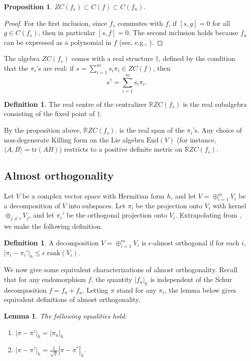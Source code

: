 \documentclass[10pt]{amsart}
\newtheorem{lem}[thm]{Lemma}
\newtheorem{prop}[thm]{Proposition}
\theoremstyle{definition}
\newtheorem{defn}[thm]{Definition}
\begin{document}
\begin{prop}\label{note}
   $ZC(f_s)\subset C(f) \subset C(f_n).$
\end{prop}
\begin{proof}
    For the first inclusion, since $f_s$ commutes with $f$, if $[s,g] = 0$ for all $g \in C(f_s)$, then in particular $[s,f] = 0$. The second inclusion holds because $f_n$ can be expressed as a polynomial in $f$ (see, e.g., \cite[section 4.2]{Hu}).
\end{proof}
The algebra $ZC(f_s)$ comes with a real structure $\dagger$, defined by the condition that the $\pi_i$'s are real: if $s=\sum_{i=1}^m s_i\pi_i\in ZC(f)$, then $$s^\dagger=\sum_{i=1}^m \overline{s_i}\pi_i.$$
\begin{defn} \label{defn: real toral}
    The real centre of the centralizer $\mathbb{R}ZC(f_s)$ is the real subalgebra consisting of the fixed point of $\dagger.$
\end{defn}
By the proposition above, $\mathbb{R}ZC(f_s).$ is the real span  of the $\pi_i$'s. Any choice of non-degenerate Killing form on the Lie algebra $\mathrm{End}(V)$ (for instance, $\langle A, B \rangle = \mathrm{tr}(AB)$) restricts to a positive definite metric on $\mathbb{R}ZC(f_s)$.



\subsection{Almost orthogonality}
Let $V$ be a complex vector space with Hermitian form $h$, and let $V = \oplus_{i=1}^m V_i$ be a decomposition of $V$ into subspaces. Let $\pi_i$ be the projection onto $V_i$ with kernel $\oplus_{j \neq i} V_j$, and let $\pi_i'$ be the orthogonal projection onto $V_i$. Extrapolating from \cite{Mo}, we make the following definition.
\begin{defn} \label{defn: almost orthogonal}
    A decomposition $V = \oplus_{i=1}^m V_i$ is $\epsilon$-almost orthogonal if for each $i$, $|\pi_i - \pi_i'|_h \leq \epsilon\; \mathrm{rank}(V_i)$.
\end{defn}

We now give some equivalent characterizations of almost orthogonality. Recall that for any endomorphism $f$, the quantity $|f_u|_h$ is independent of the Schur decomposition $f = f_a + f_u$. Letting $\pi$ stand for any $\pi_i$, the lemma below gives equivalent definitions of almost orthogonality.

\begin{lem}\label{lem:almostorthogonal1} The following equalities hold:
\begin{enumerate}
    \item $|\pi - \pi'|_h = |\pi_u|_h$
    \item $|\pi - \pi'|_h = \frac{1}{\sqrt{2}} |\pi - \pi^*|_h$.
\end{enumerate}
\end{lem}
\end{document}
